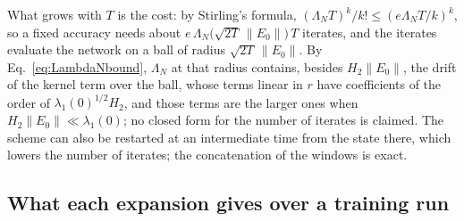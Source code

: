 \documentclass[11pt]{article}
\theoremstyle{definition}
\theoremstyle{remark}
\begin{document}
What grows with $T$ is the cost: by Stirling's formula, $(\Lambda_NT)^k/k!\le(e\Lambda_NT/k)^k$, so a fixed accuracy needs about $e\,\Lambda_N\big(\sqrt{2T}\,\|E_0\|\big)\,T$ iterates, and the iterates evaluate the network on a ball of radius $\sqrt{2T}\,\|E_0\|$.
By Eq.~\eqref{eq:LambdaNbound}, $\Lambda_N$ at that radius contains, besides $H_2\|E_0\|$, the drift of the kernel term over the ball, whose terms linear in $r$ have coefficients of the order of $\lambda_1(0)^{1/2}H_2$, and those terms are the larger ones when $H_2\|E_0\|\ll\lambda_1(0)$; no closed form for the number of iterates is claimed.
The scheme can also be restarted at an intermediate time from the state there, which lowers the number of iterates; the concatenation of the windows is exact.

\subsection{What each expansion gives over a training run}
\end{document}
